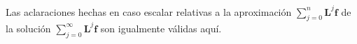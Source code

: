 Las aclaraciones hechas en caso escalar relativas a la aproximación $\displaystyle \sum_{j=0}^{n}\textbf{L}^j\textbf{f}$ de la solución $\displaystyle \sum_{j=0}^{\infty}\textbf{L}^j\textbf{f}$ son igualmente válidas aquí.

\endinput
